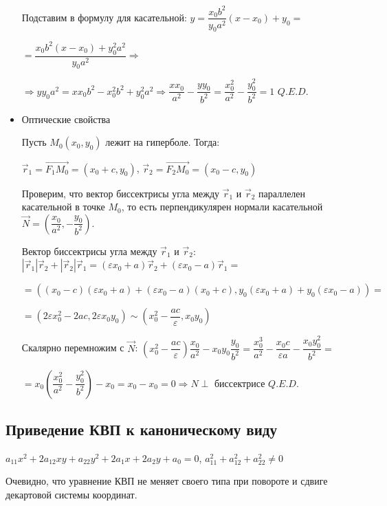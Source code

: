 \documentclass[twoside]{book}
\begin{document}
\begin{itemize}
          Подставим в формулу для касательной: \(y = \dfrac{x_0 b^2}{y_0 a^2}(x - x_0) + y_0=\)

          \(= \dfrac{x_0 b^2 (x - x_0) + y_0^2 a^2}{y_0 a^2} \Rightarrow\)

          \(\Rightarrow y y_0 a^2 = x x_0 b^2 - x_0^2 b^2 + y_0^2 a^2 \Rightarrow \dfrac{x x_0}{a^2} - \dfrac{y y_0}{b^2} = \dfrac{x_0^2}{a^2} - \dfrac{y_0^2}{b^2} = 1\) \(Q.E.D.\)

    \item Оптические свойства

          Пусть \(M_0(x_0, y_0)\) лежит на гиперболе. Тогда:

          \(\vec r_1 = \overrightarrow{F_1 M_0} = (x_0 + c, y_0)\), \(\vec r_2 = \overrightarrow{F_2 M_0} = (x_0 - c, y_0)\)

          Проверим, что вектор биссектрисы угла между \(\vec r_1\) и \(\vec r_2\) параллелен касательной в точке \(M_0\), то есть перпендикулярен нормали касательной \(\vec N = \left(\dfrac{x_0}{a^2}, -\dfrac{y_0}{b^2}\right)\).

          Вектор биссектрисы угла между \(\vec r_1\) и \(\vec r_2\): \(|\vec r_1|\vec r_2 + |\vec r_2| \vec r_1 = (\varepsilon x_0 + a) \vec r_2 + (\varepsilon x_0 - a) \vec r_1 =\)

          \(=((x_0 - c)(\varepsilon x_0 + a) + (\varepsilon x_0 - a)(x_0 + c), y_0(\varepsilon x_0 + a) + y_0(\varepsilon x_0 - a)) =\)

          \(= (2\varepsilon x_0^2 - 2ac, 2 \varepsilon x_0 y_0) \sim \left(x_0^2 - \dfrac{ac}{\varepsilon}, x_0 y_0\right)\)

          Скалярно перемножим с \(\vec N\): \(\left(x_0^2 - \dfrac{ac}{\varepsilon}\right)\dfrac{x_0}{a^2} - x_0 y_0 \dfrac{y_0}{b^2} = \dfrac{x_0^3}{a^2} - \dfrac{x_0 c}{\varepsilon a} - \dfrac{x_0 y_0^2}{b^2} =\)

          \(= x_0 \left(\dfrac{x_0^2}{a^2} - \dfrac{y_0^2}{b^2}\right) - x_0 = x_0 - x_0 = 0 \Rightarrow N \perp\) биссектрисе \(Q.E.D.\)
\end{itemize}

\subsection{Приведение КВП к каноническому виду}
\(a_{11} x^2 + 2 a_{12} x y + a_{22} y^2 + 2 a_1 x + 2 a_2 y + a_0 = 0\), \(a_{11}^2 + a_{12}^2 + a_{22}^2 \neq 0\)

Очевидно, что уравнение КВП не меняет своего типа при повороте и сдвиге декартовой системы координат.
\end{document}
